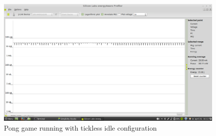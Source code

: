 \begin{figure}[H]
  \centering
  \includegraphics[clip, trim=0cm 0cm 0cm 0cm, width=12cm]{fig/runningIdle.png}
  \caption{Pong game running with tickless idle configuration}
\end{figure}
